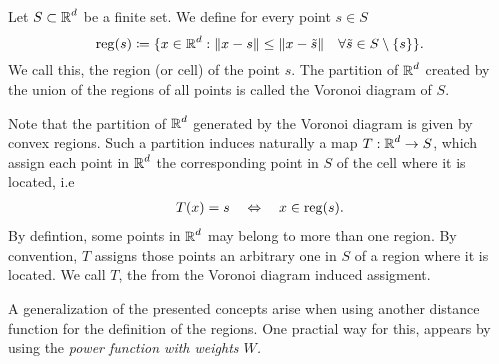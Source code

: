 \documentclass[
     12pt,         %
     a4paper,      %
     BCOR=10mm,     %
     DIV=14,        %
     ]{scrreprt}
\begin{document}
    \begin{defi}
        Let $S\subset \operatorname{\mathbb{R}}^d$ be a finite set.  We define for every point $s\in S$
        \[\operatorname{reg}(s) \coloneqq \{x \in \operatorname{\mathbb{R}}^d : \|x-s\| \le \|x-\tilde s \| \quad  \forall \tilde s \in S\setminus \{s\} \}. \]
        We call this, the region (or cell) of the point $s$.
        The partition of $\operatorname{\mathbb{R}}^d$ created by the union of the regions of all points is called the Voronoi diagram of $S$.
    \end{defi}
    \begin{rem}
        Note that the partition of $\operatorname{\mathbb{R}}^d$ generated by the Voronoi diagram is given by convex regions.  Such a partition induces naturally a map $T: \operatorname{\mathbb{R}}^d \to S$, which assign each point in $\operatorname{\mathbb{R}}^d$ the corresponding 
        point in $S$ of the cell where it is located, i.e
         \begin{align} \label{eq::reg}
             T(x) = s \quad \Leftrightarrow \quad x\in \operatorname{reg}(s).  
         \end{align}
         By defintion, some points in $\operatorname{\mathbb{R}}^d$ may belong to more than one region.  By convention, $T$ assigns those points an arbitrary one in $S$ of a region
         where it is located. We call $T$, the from the Voronoi diagram induced assigment. 
    \end{rem}
    A generalization of the presented concepts arise when using another distance function for the definition of the regions. 
    One practial way for this, appears by using the \textit{power function with weights $W$.}
\end{document}
